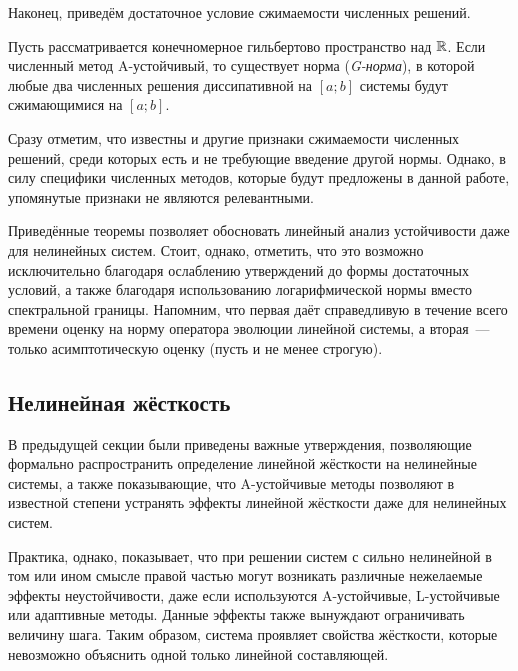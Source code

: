 Наконец, приведём достаточное условие сжимаемости численных решений.

\begin{theorem}[Далквист, 1978]
    Пусть рассматривается конечномерное гильбертово пространство над $ \mathbb{R} $.
    Если численный метод A-устойчивый, то существует норма (\emph{G-норма}),
    в которой любые два численных решения диссипативной на $ [a; b] $ системы будут сжимающимися на $ [a; b] $.
\end{theorem}

Сразу отметим, что известны и другие признаки сжимаемости численных решений,
среди которых есть и не требующие введение другой нормы.
Однако, в силу специфики численных методов, которые будут предложены в данной работе,
упомянутые признаки не являются релевантными.

Приведённые теоремы позволяет обосновать линейный анализ устойчивости даже для нелинейных систем.
Стоит, однако, отметить, что это возможно исключительно благодаря ослаблению утверждений до формы достаточных условий,
а также благодаря использованию логарифмической нормы вместо спектральной границы.
Напомним, что первая даёт справедливую в течение всего времени оценку на норму оператора эволюции линейной системы,
а вторая~--- только асимптотическую оценку (пусть и не менее строгую).


\subsection{Нелинейная жёсткость}
\label{subsec:nonlinear_stiffness}

В предыдущей секции были приведены важные утверждения,
позволяющие формально распространить определение линейной жёсткости на нелинейные системы,
а также показывающие, что A-устойчивые методы позволяют в известной степени устранять эффекты линейной жёсткости даже для нелинейных систем.

Практика, однако, показывает, что при решении систем с сильно нелинейной в том или ином смысле правой частью
могут возникать различные нежелаемые эффекты неустойчивости,
даже если используются A-устойчивые, L-устойчивые или адаптивные методы.
Данные эффекты также вынуждают ограничивать величину шага.
Таким образом, система проявляет свойства жёсткости, которые невозможно объяснить одной только линейной составляющей.

